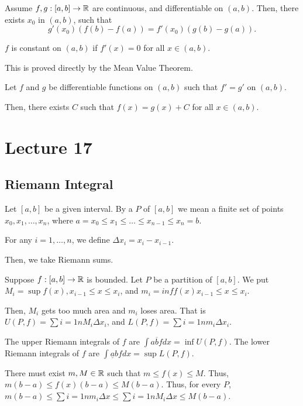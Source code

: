 \documentclass{book}
\begin{document}
\begin{thm}
    Assume $f, g : [a, b] \to \mathbb{R}$ are continuous, and differentiable on $(a, b)$. Then, there exists $x_0$ in $(a, b)$, such that \[g'(x_0)(f(b) - f(a)) = f'(x_0)(g(b) - g(a)).\]
\end{thm}

\begin{corollary} 
    $f$ is constant on $(a, b)$ if $f'(x) = 0$ for all $x \in (a, b)$.
\end{corollary}

This is proved directly by the Mean Value Theorem.

\begin{corollary}
    Let $f$ and $g$ be differentiable functions on $(a, b)$ such that $f' = g'$ on $(a, b)$. 

    Then, there exists $C$ such that $f(x) = g(x) + C$ for all $x \in (a, b)$.
\end{corollary}
\section{Lecture 17}
\subsection{Riemann Integral}
\begin{defn}
    Let $[a, b]$ be a given interval. By a  $P$ of $[a, b]$ we mean a finite set of points $x_0, x_1, \ldots, x_n$, where $a = x_0 \leq x_1 \leq \ldots \leq x_{n - 1} \leq x_n = b$.

    For any $i = 1, \ldots, n$, we define $\Delta x_i = x_i - x_{i - 1}$. 
\end{defn}

Then, we take Riemann sums.

Suppose $f : [a, b] \to \mathbb{R}$ is bounded. Let $P$ be a partition of $[a, b]$. We put $M_i = \sup f(x), x_{i-1} \leq x \leq x_i$, and $m_i = inf f(x) x_{i-1} \leq x \leq x_i$. 

Then, $M_i$ gets too much area and $m_i$ loses area. That is $U(P, f) = \sum{i = 1}{n} M_i \Delta x_i$, and $L(P, f) = \sum{i = 1}{n} m_i \Delta x_i$. 

The upper Riemann integrals of $f$ are $\int{a}{\overline b} f dx = \inf U(P, f)$. The lower Riemann integrals of $f$ are $\int{\underline a}{b} f dx = \sup L(P, f)$.

There must exist $m, M \in \mathbb{R}$ such that $m \leq f(x) \leq M$. Thus, $m(b - a) \leq f(x)(b - a) \leq M(b - a)$. Thus, for every $P$, $m(b - a) \leq \sum{i = 1}{n} m_i \Delta x \leq \sum{i = 1}{n} M_i \Delta x \leq M(b - a)$.
\end{document}
